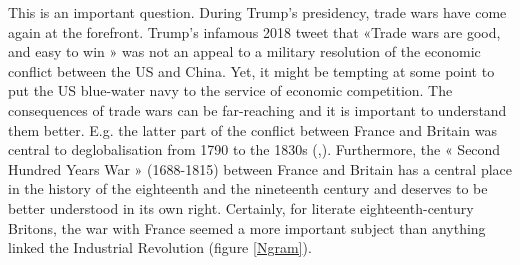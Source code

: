 \documentclass[12pt,a4paper,notitlepage,english]{article}
\begin{document}
This is an important question.
During Trump’s presidency, trade wars have come again at the forefront.
Trump’s infamous 2018 tweet that «Trade wars are good, and easy to win » was not an appeal to a military resolution of the economic conflict between the US and China.
Yet, it might be tempting at some point to put the US blue-water navy to the service of economic competition.
The consequences of trade wars can be far-reaching and it is important to understand them better.
E.g. the latter part of the conflict between France and Britain was central to deglobalisation from 1790 to the 1830s (\cite{ORourke2006},\cite[table 4.5]{ORourke2010}).
Furthermore, the « Second Hundred Years War » (1688-1815) between France and Britain has a central place in the history of the eighteenth and the nineteenth century and deserves to be better understood in its own right.
Certainly, for literate eighteenth-century Britons, the war with France seemed a more important subject than anything linked the Industrial Revolution (figure \ref{Ngram}).





\end{document}
